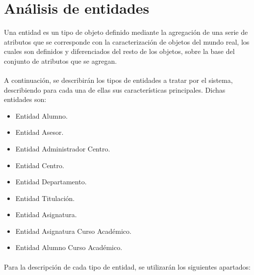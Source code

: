 \section{Análisis de entidades}

   \paragraph{}Una entidad es un tipo de objeto definido mediante la agregación
   de una serie de atributos que se corresponde con la caracterización de
   objetos del mundo real, los cuales son definidos y diferenciados del resto de
   los objetos, sobre la base del conjunto de atributos que se agregan.

   \paragraph{}A continuación, se describirán los tipos de entidades a tratar
   por el sistema, describiendo para cada una de ellas sus características
   principales. Dichas entidades son:

   \begin{itemize}
    \item Entidad Alumno.
    \item Entidad Asesor.
    \item Entidad Administrador Centro.
    \item Entidad Centro.
    \item Entidad Departamento.
    \item Entidad Titulación.
    \item Entidad Asignatura.
    \item Entidad Asignatura Curso Académico.
    \item Entidad Alumno Curso Académico.
   \end{itemize}

   \paragraph{}Para la descripción de cada tipo de entidad, se utilizarán los
   siguientes apartados:

